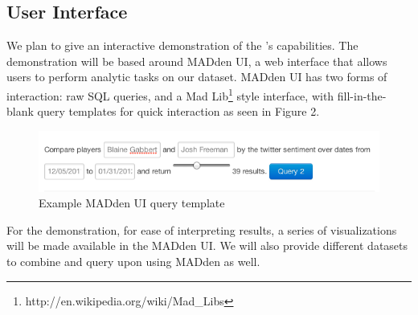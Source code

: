 \subsection{User Interface}

We plan to give an interactive demonstration of the 
{\system}'s capabilities. The demonstration will be based around MADden UI,
a web interface that allows users to perform analytic tasks on our dataset.
MADden UI has two forms of interaction: raw SQL queries, and a Mad
Lib\footnote{http://en.wikipedia.org/wiki/Mad\_Libs} style interface, with
fill-in-the-blank query templates for quick interaction as seen in Figure
2.

\begin{figure}
\begin{center}
	\includegraphics[scale=.43]{content/graphics/example_madlib.png}
\end{center}
\caption{Example MADden UI query template} 
\label{fig:madlib}
\end{figure}

For the demonstration, for ease of interpreting results, a series of
visualizations will be made available in the MADden UI. We will also provide
different datasets to combine and query upon using MADden as well.

